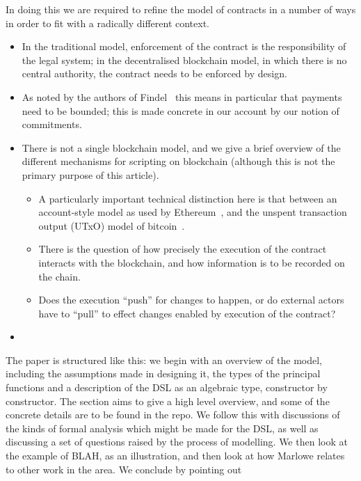 \documentclass[
      acmsmall
    , screen
    , review=true
  ]{acmart}
\begin{document}
In doing this we are required to refine the model of contracts in a number of ways in order to fit with a radically different context. 
\begin{itemize}
\item In the traditional model, enforcement of the contract is the responsibility of the legal system; in the decentralised blockchain model, in which there is no central authority, the contract needs to be enforced by design. 
\item As noted by  the authors of Findel~\cite{findel} this means in particular that payments need to be bounded; this is made concrete in our account by our notion of commitments.
\item There is not a single blockchain model, and we give a brief overview of the different mechanisms for scripting on blockchain (although this is not the primary purpose of this article). 
\begin{itemize}
\item
A particularly important technical distinction here is that between an account-style model as used by Ethereum~\cite{EthereumRationale}, and the unspent transaction output (UTxO) model of bitcoin~\cite{sok}. 
\item There is the question of how precisely the execution of the contract interacts with the blockchain, and how information is to be recorded on the chain.
\item Does the execution ``push'' for changes  to happen, or do external actors have to ``pull'' to effect changes enabled by execution of the contract?
\end{itemize}
\item {}
\end{itemize}

\noindent
{}
The paper is structured like this: we begin with an overview of the model, including the assumptions made in designing it, the types of the principal functions and a description of the DSL as an algebraic type, constructor by constructor. The section aims to give a high level overview, and some of the concrete details are to be found in the repo. We follow this with discussions of the kinds of formal analysis which might be made for the DSL, as well as discussing a  set of questions raised by the process of modelling. We then look at the example of BLAH, as an illustration, and then look at how Marlowe relates to other work in the area. We conclude by pointing out 
\end{document}
